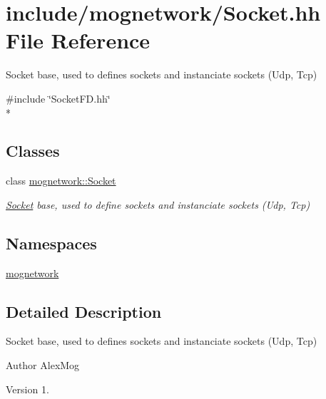 \hypertarget{_socket_8hh}{\section{include/mognetwork/\-Socket.hh File Reference}
\label{_socket_8hh}
}


Socket base, used to defines sockets and instanciate sockets (Udp, Tcp)  


{\ttfamily \#include \char`\"{}Socket\-F\-D.\-hh\char`\"{}}\\*
\subsection*{Classes}
\begin{DoxyCompactItemize}
\item 
class \hyperlink{classmognetwork_1_1_socket}{mognetwork\-::\-Socket}
\begin{DoxyCompactList}\small\item\em \hyperlink{classmognetwork_1_1_socket}{Socket} base, used to define sockets and instanciate sockets (Udp, Tcp) \end{DoxyCompactList}\end{DoxyCompactItemize}
\subsection*{Namespaces}
\begin{DoxyCompactItemize}
\item 
\hyperlink{namespacemognetwork}{mognetwork}
\end{DoxyCompactItemize}


\subsection{Detailed Description}
Socket base, used to defines sockets and instanciate sockets (Udp, Tcp) \begin{DoxyAuthor}{Author}
Alex\-Mog 
\end{DoxyAuthor}
\begin{DoxyVersion}{Version}
1. 
\end{DoxyVersion}
